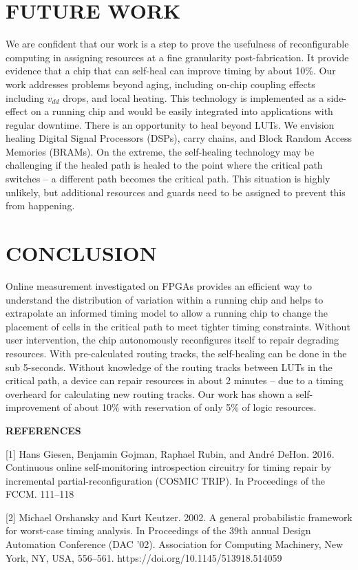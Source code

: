 \documentclass[11pt]{report}
\begin{document}
\begin{mainf}
\section{\textbf{FUTURE WORK}}
We are confident that our work is a step to prove the usefulness of reconfigurable computing in assigning resources at a fine granularity post-fabrication. It provide evidence that a chip that can self-heal can improve timing by about 10\%. Our work addresses problems beyond aging, including on-chip coupling effects including $v_{dd}$ drops, and local heating. This technology is implemented as a side-effect on a running chip and would be easily integrated into applications with regular downtime. There is an opportunity to heal beyond LUTs. We envision healing Digital Signal Processors (DSPs), carry chains, and Block Random Access Memories (BRAMs). On the extreme, the self-healing technology may be challenging if the healed path is healed to the point where the critical path switches -- a different path becomes the critical path. This situation is highly unlikely, but additional resources and guards need to be assigned to prevent this from happening. 

\section{\textbf{CONCLUSION}}

Online measurement investigated on FPGAs provides an efficient way to understand the distribution of variation within a running chip and helps to extrapolate an informed timing model to allow a running chip to change the placement of cells in the critical path to meet tighter timing constraints.  Without user intervention, the chip autonomously reconfigures itself to repair degrading resources. With pre-calculated routing tracks, the self-healing can be done in the sub 5-seconds. Without knowledge of the routing tracks between LUTs in the critical path, a device can repair resources in about 2 minutes -- due to a timing overheard for calculating new routing tracks. Our work has shown a self-improvement of about 10\% with reservation of only 5\% of logic resources. 

\newpage
\textbf{REFERENCES}

[1] Hans Giesen, Benjamin Gojman, Raphael Rubin, and André DeHon. 2016. Continuous online self-monitoring introspection circuitry for timing repair by incremental partial-reconfiguration (COSMIC TRIP). In Proceedings of the
FCCM. 111–118

[2] Michael Orshansky and Kurt Keutzer. 2002. A general probabilistic framework for worst-case timing analysis. In Proceedings of the 39th annual Design Automation Conference (DAC '02). Association for Computing Machinery, New York, NY, USA, 556–561. https://doi.org/10.1145/513918.514059


\end{mainf}
\end{document}
